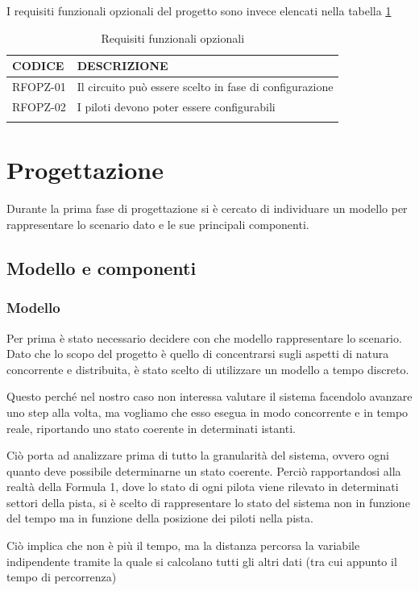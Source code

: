 \documentclass[a4paper,11pt, twoside]{book}
\begin{document}
    I requisiti funzionali opzionali del progetto sono invece elencati nella tabella \ref{tbl:RequisitiFunzionaliOpzionali}
    
    \begin{longtable}{|p{2cm}|p{8cm}|}
      \toprule
	\bfseries{CODICE} & \bfseries{DESCRIZIONE} \\\hline
      \endfirsthead
      RFOPZ-01 & Il circuito può essere scelto in fase di configurazione \\\cline{1-2}
      RFOPZ-02 & I piloti devono poter essere configurabili \\\cline{1-2}
      \caption{Requisiti funzionali opzionali}
      \label{tbl:RequisitiFunzionaliOpzionali}
    \end{longtable}
    
  
  \chapter{Progettazione}
    Durante la prima fase di progettazione si è cercato di individuare un modello per rappresentare
    lo scenario dato e le sue principali componenti.
    
    \section{Modello e componenti}
      \subsection{Modello}
	Per prima è stato necessario decidere con che modello rappresentare lo scenario. Dato che lo scopo
	del progetto è quello di concentrarsi sugli aspetti di natura concorrente e distribuita, è stato scelto di utilizzare un
	modello a tempo discreto.
	
	Questo perché nel nostro caso non interessa valutare il sistema facendolo avanzare uno step alla volta, ma
	vogliamo che esso esegua in modo concorrente e in tempo reale, riportando uno stato coerente in determinati istanti.
	
	Ciò porta ad analizzare prima di tutto la granularità del sistema, ovvero ogni quanto deve possibile determinarne un
        stato coerente. Perciò rapportandosi alla realtà della Formula 1, dove lo stato di ogni pilota viene rilevato in determinati 
	settori della pista,
	si è scelto di rappresentare lo stato del sistema non in funzione del tempo ma in funzione della
	posizione dei piloti nella pista. 
	
	Ciò implica che non è più il tempo, ma la distanza percorsa la variabile indipendente tramite la quale si calcolano
	tutti gli altri dati (tra cui appunto il tempo di percorrenza)
	
\end{document}
